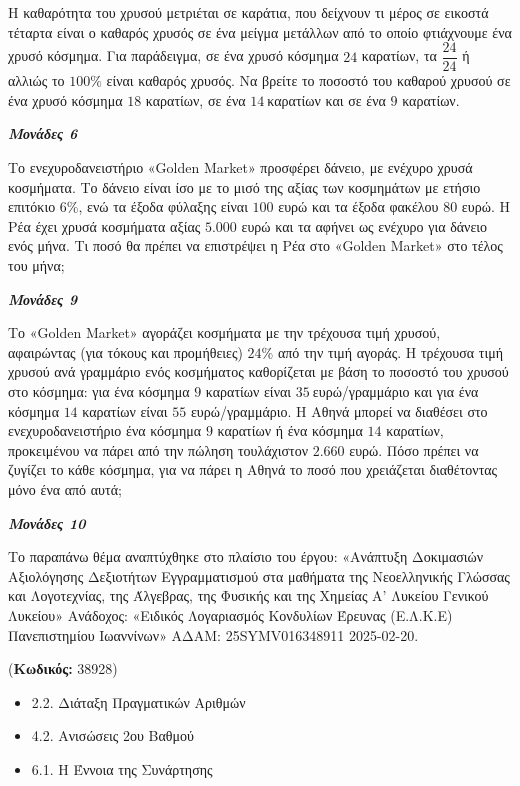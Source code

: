 \documentclass[11pt,a4paper,twoside]{book}
\newcounter{askhsh}[chapter]
\renewcommand{\theaskhsh}{
	\bf{\titlefont{\Large{\thechapter}}.\arabic{askhsh}}
}
\newcommand{\Askhsh}[2]{\refstepcounter{askhsh}{\titlefont{Άσκηση\theaskhsh} - \textcolor{maincolor}{ΘΕΜΑ #2}} ({\small{\textbf{Κωδικός:} #1}})\\}{}
\newenvironment{ylh}{
\begin{tcolorbox}[
breakable,
enhanced standard,
titlerule=0pt,
toprule=0pt, 
rightrule=0pt, 
bottomrule=0pt,
title={\titlefont Ύλη άσκησης},
colback=white,
opacityback=0,
left=2mm,
top=1mm,
bottom=0mm,
boxrule=0pt,
colframe=white,
borderline west={1.5mm}{0pt}{secondarycolor},
leftrule=2mm,
sharp corners,
coltitle=black
]
\begin{itemize}[leftmargin=3mm, itemsep=0mm, label=\textcolor{secondarycolor}{{\small\faBook}}]
}{
\end{itemize}
\end{tcolorbox}
}
\newcommand{\monades}[1]{
\hspace*{\fill}
\textbf{\textit{\textcolor{maincolor}{Μονάδες #1}}}}
\begin{document}
\begin{alist}
\item Η καθαρότητα του χρυσού μετριέται σε καράτια, που δείχνουν τι μέρος σε εικοστά τέταρτα είναι ο καθαρός χρυσός σε ένα μείγμα μετάλλων από το οποίο φτιάχνουμε ένα χρυσό κόσμημα. Για παράδειγμα, σε ένα χρυσό κόσμημα $24$ καρατίων, τα $\dfrac{24}{24}$ ή αλλιώς το $100\%$ είναι καθαρός χρυσός. Να βρείτε το ποσοστό του καθαρού χρυσού σε ένα χρυσό κόσμημα $18$ καρατίων, σε ένα $14\ $καρατίων και σε ένα $9$ καρατίων.
\monades{6}
\item Το ενεχυροδανειστήριο «Golden Market» προσφέρει δάνειο, με ενέχυρο χρυσά κοσμήματα. Το δάνειο είναι ίσο με το μισό της αξίας των κοσμημάτων με ετήσιο επιτόκιο $6\%$, ενώ τα έξοδα φύλαξης είναι $100$ ευρώ και τα έξοδα φακέλου $80$ ευρώ. Η Ρέα έχει χρυσά κοσμήματα αξίας $5.000$ ευρώ και τα αφήνει ως ενέχυρο για δάνειο ενός μήνα. Τι ποσό θα πρέπει να επιστρέψει η Ρέα στο «Golden Market» στο τέλος του μήνα;
\monades{9}
\item Το «Golden Market» αγοράζει κοσμήματα με την τρέχουσα τιμή χρυσού, αφαιρώντας (για τόκους και προμήθειες) $24\%$ από την τιμή αγοράς. Η τρέχουσα τιμή χρυσού ανά γραμμάριο ενός κοσμήματος καθορίζεται με βάση το ποσοστό του χρυσού στο κόσμημα: για ένα κόσμημα $9$ καρατίων είναι $35\ $ευρώ/γραμμάριο και για ένα κόσμημα $14$ καρατίων είναι $55$ ευρώ/γραμμάριο. Η Αθηνά μπορεί να διαθέσει στο ενεχυροδανειστήριο ένα κόσμημα $9$ καρατίων ή ένα κόσμημα $14$ καρατίων, προκειμένου να πάρει από την πώληση τουλάχιστον $2.660$ ευρώ. Πόσο πρέπει να ζυγίζει το κάθε κόσμημα, για να πάρει η Αθηνά το ποσό που χρειάζεται διαθέτοντας μόνο ένα από αυτά;
\monades{10}

{\footnotesize Το παραπάνω θέμα αναπτύχθηκε στο πλαίσιο του έργου: «Ανάπτυξη Δοκιμασιών Αξιολόγησης Δεξιοτήτων Εγγραμματισμού στα μαθήματα της Νεοελληνικής Γλώσσας και Λογοτεχνίας, της Άλγεβρας, της Φυσικής και της Χημείας Α' Λυκείου Γενικού Λυκείου» Ανάδοχος: «Ειδικός Λογαριασμός Κονδυλίων Έρευνας (Ε.Λ.Κ.Ε) Πανεπιστημίου Ιωαννίνων» ΑΔΑΜ: 25SYMV016348911 2025-02-20.}
\end{alist}

\vspace{4mm}
\Askhsh{38928}{4}
\begin{ylh}
    \item 2.2. Διάταξη Πραγματικών Αριθμών
    \item 4.2. Ανισώσεις 2ου Βαθμού
    \item 6.1. Η Έννοια της Συνάρτησης
\end{ylh}
\end{document}
